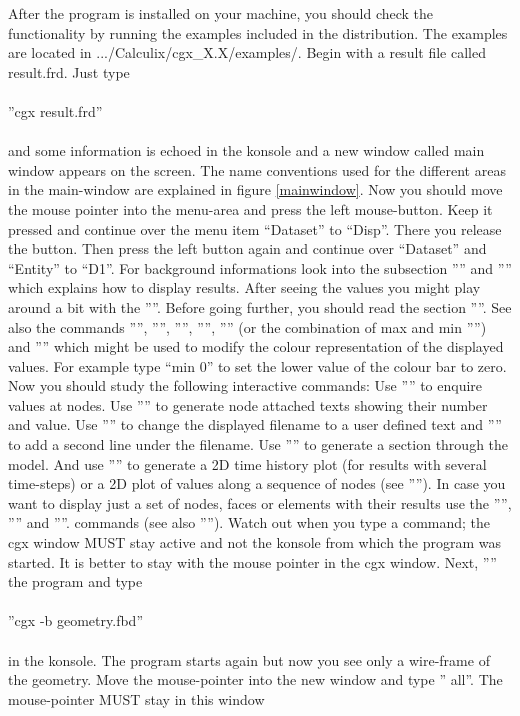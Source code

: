 \documentclass{article}
\begin{document}
After the program is installed on your machine, you should check the functionality by running the examples included in the distribution. The examples are located in .../Calculix/cgx\_X.X/examples/. Begin with a result file called result.frd. Just type\\\\  ''cgx result.frd''\\\\and some information is echoed in the konsole and a new window called main window appears on the screen. The name conventions used for the different areas in the main-window are explained in figure \ref{mainwindow}. Now you should move the mouse pointer into the menu-area and press the left mouse-button. Keep it pressed and continue over the menu item ``Dataset'' to ``Disp''. There you release the button. Then press the left button again and continue over ``Dataset'' and ``Entity'' to ``D1''. For background informations look into the subsection '''' and '''' which explains how to display results. After seeing the values you might play around a bit with the ''''. Before going further, you should read the section ''''. See also the commands '''', '''', '''', '''', '''' (or the combination of max and min '''') and '''' which might be used to modify the colour representation of the displayed values. For example type ``min 0'' to set the lower value of the colour bar to zero. Now you should study the following interactive commands: Use '''' to enquire values at nodes. Use '''' to generate node attached texts showing their number and value. Use '''' to change the displayed filename to a user defined text and '''' to add a second line under the filename. Use '''' to generate a section through the model. And use '''' to generate a 2D time history plot (for results with several time-steps) or a 2D plot of values along a sequence of nodes (see ''''). In case you want to display just a set of nodes, faces or elements with their results use the '''', '''' and ''''. commands (see also '''').  Watch out when you type a command; the cgx window MUST stay active and not the konsole from which the program was started. It is better to stay with the mouse pointer in the cgx window. Next, '''' the program and type\\\\  ''cgx -b geometry.fbd''\\\\in the konsole. The program starts again but now you see only a wire-frame of the geometry. Move the mouse-pointer into the new window and type '' all''. The mouse-pointer MUST stay in this window 
\end{document}
